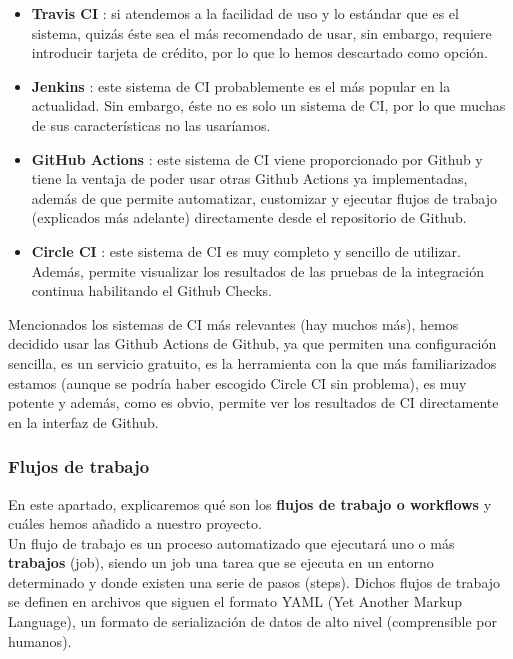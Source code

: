     \begin{itemize}
        \item \textbf{Travis CI} \cite{travis-ci}: si atendemos a la facilidad de uso y lo
        estándar que es el sistema, quizás éste sea el más recomendado de usar, sin embargo,
        requiere introducir tarjeta de crédito, por lo que lo hemos descartado como opción.
        \item \textbf{Jenkins} \cite{jenkins}: este sistema de CI probablemente es el más
        popular en la actualidad. Sin embargo, éste no es solo un sistema de CI, por lo
        que muchas de sus características no las usaríamos.
        \item \textbf{GitHub Actions} \cite{github-actions}: este sistema de CI viene
        proporcionado por Github y tiene la ventaja de poder usar otras Github Actions ya
        implementadas, además de que permite automatizar, customizar y ejecutar flujos de
        trabajo (explicados más adelante) directamente desde el repositorio de Github.
        \item \textbf{Circle CI} \cite{circle-ci}: este sistema de CI es muy completo y
        sencillo de utilizar. Además, permite visualizar los resultados de las pruebas de la
        integración continua habilitando el Github Checks.
    \end{itemize}

    Mencionados los sistemas de CI más relevantes (hay muchos más), hemos decidido usar las
    Github Actions de Github, ya que permiten una configuración sencilla, es un servicio
    gratuito, es la herramienta con la que más familiarizados estamos (aunque se podría haber
    escogido Circle CI sin problema), es muy potente y además, como es obvio, permite ver los
    resultados de CI directamente en la interfaz de Github.

\newpage
\subsubsection{Flujos de trabajo}
En este apartado, explicaremos qué son los \textbf{flujos de trabajo o workflows} y cuáles
hemos añadido a nuestro proyecto.\\

Un flujo de trabajo es un proceso automatizado que ejecutará uno o más \textbf{trabajos}
(job), siendo un job una tarea que se ejecuta en un entorno determinado y donde existen una
serie de pasos (steps). Dichos flujos de trabajo se definen en archivos que siguen el formato
YAML (Yet Another Markup Language), un formato de serialización de datos de alto nivel
(comprensible por humanos).\\

